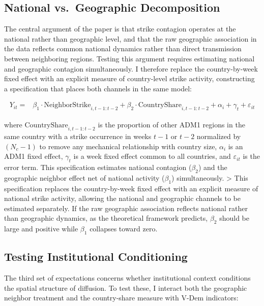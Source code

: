 \documentclass[
  11pt,
]{article}
\begin{document}
\subsection{National vs.~Geographic
Decomposition}\label{national-vs.-geographic-decomposition}

The central argument of the paper is that strike contagion operates at
the national rather than geographic level, and that the raw geographic
association in the data reflects common national dynamics rather than
direct transmission between neighboring regions. Testing this argument
requires estimating national and geographic contagion simultaneously. I
therefore replace the country-by-week fixed effect with an explicit
measure of country-level strike activity, constructing a specification
that places both channels in the same model:

\[
\begin{aligned}
Y_{it} ={}& \beta_1 \cdot \text{NeighborStrike}_{i,t-1:t-2}
          + \beta_2 \cdot \text{CountryShare}_{i,t-1:t-2} 
          + \alpha_i + \gamma_t + \varepsilon_{it}
\end{aligned}
\]

\noindent where \(\text{CountryShare}_{i,t-1:t-2}\) is the proportion of
other ADM1 regions in the same country with a strike occurrence in weeks
\(t-1\) or \(t-2\) normalized by \((N_c - 1)\) to remove any mechanical
relationship with country size, \(\alpha_i\) is an ADM1 fixed effect,
\(\gamma_t\) is a week fixed effect common to all countries, and
\(\varepsilon_{it}\) is the error term. This specification estimates
national contagion (\(\beta_2\)) and the geographic neighbor effect net
of national activity (\(\beta_1\)) simultaneously. \textgreater{} This
specification replaces the country-by-week fixed effect with an explicit
measure of national strike activity, allowing the national and
geographic channels to be estimated separately. If the raw geographic
association reflects national rather than geographic dynamics, as the
theoretical framework predicts, \(\beta_2\) should be large and positive
while \(\beta_1\) collapses toward zero.

\subsection{Testing Institutional
Conditioning}\label{testing-institutional-conditioning}

The third set of expectations concerns whether institutional context
conditions the spatial structure of diffusion. To test these, I interact
both the geographic neighbor treatment and the country-share measure
with V-Dem indicators:
\end{document}
